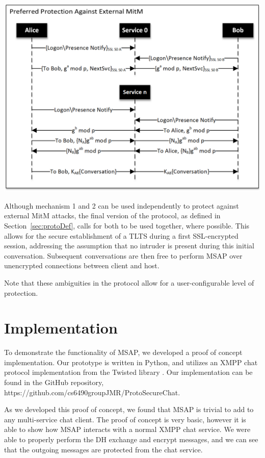 \documentclass[twoside,10pt]{article}
\newenvironment{Figure}
  {\par\medskip\noindent\minipage{\linewidth}}
  {\endminipage\par\medskip}
\begin{document}
\begin{multicols}{2}
\begin{Figure}
  \centering
  \includegraphics[width=\textwidth]{SSLOnlyDiagramBW.png}
  \label{fig:sslProto}
\end{Figure}

Although mechanism 1 and 2 can be used independently to protect against external MitM attacks, the final version of the protocol, as defined in Section~\ref{sec:protoDef}, calls for both to be used together, where possible.  This allows for the secure establishment of a TLTS during a first SSL-encrypted session, addressing the assumption that no intruder is present during this initial conversation.  Subsequent conversations are then free to perform MSAP over unencrypted connections between client and host.

Note that these ambiguities in the protocol allow for a user-configurable level of protection.

\section{Implementation}
To demonstrate the functionality of MSAP, we developed a proof of concept implementation.  Our prototype is written in Python, and utilizes an XMPP chat protocol implementation from the Twisted library \cite{TwistedHomepage}.  Our implementation can be found in the GitHub repository, https://github.com/cs6490groupJMR/ProtoSecureChat.

As we developed this proof of concept, we found that MSAP is trivial to add to any multi-service chat client.  The proof of concept is very basic, however it is able to show how MSAP interacts with a normal XMPP chat service.  We were able to properly perform the DH exchange and encrypt messages, and we can see that the outgoing messages are protected from the chat service.


\end{multicols}
\end{document}
